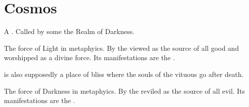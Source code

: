 


















\section{Cosmos}
\begin{gloss}







\begin{comment}
\subsection{\Erebos}
\end{comment}
\gitem{\Erebos}
A . %
Called by some the Realm of Darkness. 









\begin{comment}
\subsection{\iquin}
\end{comment}
\gitem{\iquin}
The force of Light in  metaphyics. 
By the  viewed as the source of all good and worshipped as a divine force. 
Its manifestations are the . 

\Iquin{} is also supposedly a place of bliss where the souls of the vituous go after death. 







\begin{comment}
\subsection{\itzach}
\end{comment}
\gitem{\Itzach}
The force of Darkness in  metaphyics. 
By the  reviled as the source of all evil. 
Its manifestations are the . 


\end{gloss}
